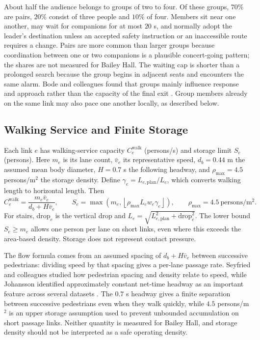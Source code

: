 \documentclass[11pt,a4paper]{article}
\begin{document}
About half the audience belongs to groups of two to four. Of these groups, $70\%$ are pairs, $20\%$ consist of three people and $10\%$ of four. Members sit near one another, may wait for companions for at most $20$ s, and normally adopt the leader's destination unless an accepted safety instruction or an inaccessible route requires a change. Pairs are more common than larger groups because coordination between one or two companions is a plausible concert-going pattern; the shares are not measured for Bailey Hall. The waiting cap is shorter than a prolonged search because the group begins in adjacent seats and encounters the same alarm. Bode and colleagues found that groups mainly influence response and approach rather than the capacity of the final exit \cite{bode}. Group members already on the same link may also pace one another locally, as described below.

\subsection{Walking Service and Finite Storage}\label{sec:transport}

Each link $e$ has walking-service capacity $C_e^{\mathrm{walk}}$ (persons/s) and storage limit $S_e$ (persons). Here $m_e$ is its lane count, $\bar v_e$ its representative speed, $d_b=0.44$ m the assumed mean body diameter, $H=0.7$ s the following headway, and $\rho_{\max}=4.5$ persons/m$^2$ the storage density. Define $\gamma_e=L_{e,\mathrm{plan}}/L_e$, which converts walking length to horizontal length. Then
\begin{equation}\label{eq:link}
C_e^{\mathrm{walk}}=\frac{m_e\bar v_e}{d_b+H\bar v_e},\qquad
S_e=\max\!\left(m_e,\left\lfloor \rho_{\max}L_ew_e\gamma_e\right\rfloor\right),
\qquad\rho_{\max}=4.5\ \mathrm{persons/m^2}.
\end{equation}
For stairs, $\mathrm{drop}_e$ is the vertical drop and $L_e=\sqrt{L_{e,\mathrm{plan}}^2+\mathrm{drop}_e^2}$. The lower bound $S_e\ge m_e$ allows one person per lane on short links, even where this exceeds the area-based density. Storage does not represent contact pressure.

The flow formula comes from an assumed spacing of $d_b+H\bar v_e$ between successive pedestrians: dividing speed by that spacing gives a per-lane passage rate. Seyfried and colleagues studied how pedestrian spacing and density relate to speed, while Johansson identified approximately constant net-time headway as an important feature across several datasets \cite{seyfried,johansson}. The $0.7$ s headway gives a finite separation between successive pedestrians even when they walk quickly, while $4.5$ persons/m$^2$ is an upper storage assumption used to prevent unbounded accumulation on short passage links. Neither quantity is measured for Bailey Hall, and storage density should not be interpreted as a safe operating density.
\end{document}
